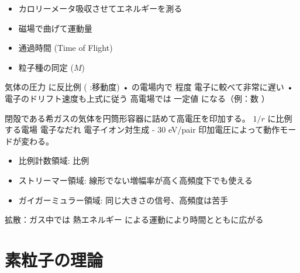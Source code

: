 \documentclass[a4paper,11pt]{jlreq}
\begin{document}
\begin{itemize}
  \item カロリーメータ吸収させてエネルギーを測る
  \item 磁場で曲げて運動量
  \item 通過時間 (Time of Flight)
  \item 粒子種の同定 ($M$)
\end{itemize}


気体の圧力 に反比例 ( :移動度)
• の電場内で 程度
電子に較べて非常に遅い
• 電子のドリフト速度も上式に従う
高電場では 一定値 になる（例：数 ）

閉殻である希ガスの気体を円筒形容器に詰めて高電圧を印加する。
$1/r$ に比例する電場
電子なだれ
電子イオン対生成
- 30 eV/pair
印加電圧によって動作モードが変わる。
\begin{itemize}
  \item 比例計数領域: 比例
  \item ストリーマー領域: 線形でない増幅率が高く高頻度下でも使える
  \item ガイガーミュラー領域: 同じ大きさの信号、高頻度は苦手
\end{itemize}

拡散：ガス中では 熱エネルギー による運動により時間とともに広がる




\section{素粒子の理論}
\end{document}
